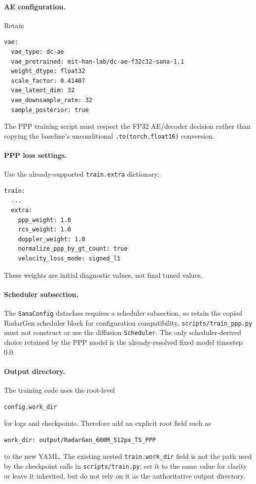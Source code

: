 \documentclass[11pt,a4paper]{article}
\begin{document}
\paragraph{AE configuration.}
Retain
\begin{lstlisting}
vae:
  vae_type: dc-ae
  vae_pretrained: mit-han-lab/dc-ae-f32c32-sana-1.1
  weight_dtype: float32
  scale_factor: 0.41407
  vae_latent_dim: 32
  vae_downsample_rate: 32
  sample_posterior: true
\end{lstlisting}

The PPP training script must respect the FP32 AE/decoder decision rather than copying the baseline's unconditional \texttt{.to(torch.float16)} conversion.

\paragraph{PPP loss settings.}
Use the already-supported \texttt{train.extra} dictionary:
\begin{lstlisting}
train:
  ...
  extra:
    ppp_weight: 1.0
    rcs_weight: 1.0
    doppler_weight: 1.0
    normalize_ppp_by_gt_count: true
    velocity_loss_mode: signed_l1
\end{lstlisting}

These weights are initial diagnostic values, not final tuned values.

\paragraph{Scheduler subsection.}
The \texttt{SanaConfig} dataclass requires a scheduler subsection, so retain the copied RadarGen scheduler block for configuration compatibility. \texttt{scripts/train\_ppp.py} must not construct or use the diffusion \texttt{Scheduler}. The only scheduler-derived choice retained by the PPP model is the already-resolved fixed model timestep \(0.0\).

\paragraph{Output directory.}
The training code uses the root-level
\begin{lstlisting}
config.work_dir
\end{lstlisting}
for logs and checkpoints. Therefore add an explicit root field such as
\begin{lstlisting}
work_dir: output/RadarGen_600M_512px_TS_PPP
\end{lstlisting}
to the new YAML. The existing nested \texttt{train.work\_dir} field is not the path used by the checkpoint calls in \texttt{scripts/train.py}; set it to the same value for clarity or leave it inherited, but do not rely on it as the authoritative output directory.
\end{document}
